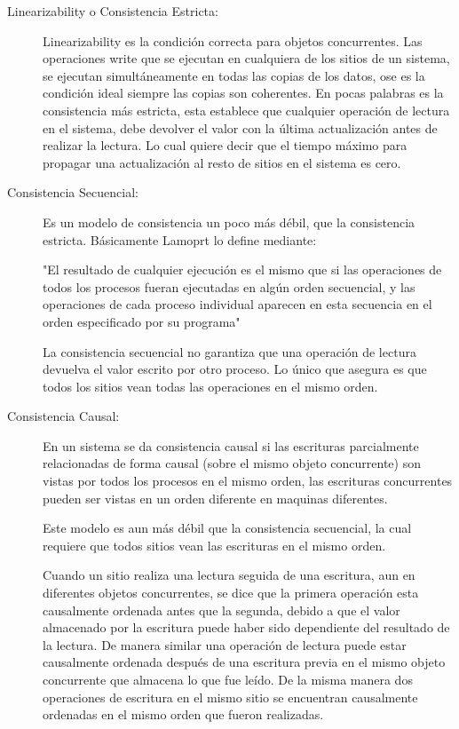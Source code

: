 \begin{description}

\item[Linearizability o Consistencia Estricta: ]
Linearizability es la condición correcta para objetos concurrentes. Las operaciones write que se ejecutan en cualquiera de los sitios de un sistema, se ejecutan simultáneamente en todas las copias de los datos, ose es la condición ideal siempre las copias son coherentes. 
En pocas palabras es la consistencia más estricta, esta establece que cualquier operación de lectura en el sistema, debe devolver el valor con la última actualización antes de realizar la lectura. Lo cual quiere decir que el tiempo máximo para propagar una actualización al resto de sitios en el sistema es cero. 

\item[Consistencia Secuencial: ]
Es un modelo de consistencia un poco más débil, que la consistencia estricta. Básicamente Lamoprt lo define mediante:

"El resultado de cualquier ejecución es el mismo que si las operaciones de todos los procesos fueran ejecutadas en algún orden secuencial, y las operaciones de cada proceso individual aparecen en esta secuencia en el orden especificado por su programa"\cite{lamport:1979}

La consistencia secuencial no garantiza que una operación de lectura devuelva el valor escrito por otro proceso. Lo único que asegura es que todos los sitios vean todas las operaciones en el mismo orden.

\item[Consistencia Causal: ]
En un sistema se da consistencia causal si las escrituras parcialmente relacionadas de forma causal (sobre el mismo objeto concurrente) son vistas por todos los procesos en el mismo orden, las escrituras concurrentes pueden ser vistas en un orden diferente en maquinas diferentes.

Este modelo es aun más débil que la consistencia secuencial, la cual requiere que todos sitios vean las escrituras en el mismo orden.

Cuando un sitio realiza una lectura seguida de una escritura, aun en diferentes objetos concurrentes, se dice que la primera operación esta causalmente ordenada antes que la segunda, debido a que el valor almacenado por la escritura puede haber sido dependiente del resultado de la lectura. De manera similar una operación de lectura puede estar causalmente ordenada después de una escritura previa en el mismo objeto concurrente que almacena lo que fue leído. De la misma manera dos operaciones de escritura en el mismo sitio se encuentran causalmente ordenadas en el mismo orden que fueron realizadas. 


\end{description}
